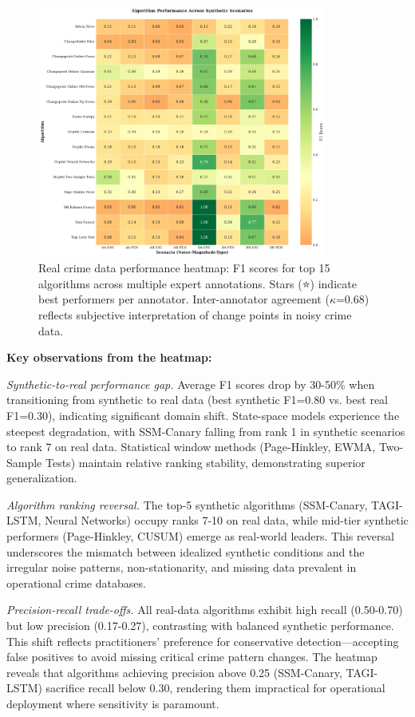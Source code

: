 \begin{figure}[H]
\centering
\includegraphics[width=0.85\textwidth]{figures/fig_scenario_heatmap.pdf}
\caption{Real crime data performance heatmap: F1 scores for top 15 algorithms across multiple expert annotations. Stars (⭐) indicate best performers per annotator. Inter-annotator agreement ($\kappa$=0.68) reflects subjective interpretation of change points in noisy crime data.}
\label{fig:real_heatmap}
\end{figure}

\textbf{Key observations from the heatmap:}

\textit{Synthetic-to-real performance gap.} Average F1 scores drop by 30-50\% when transitioning from synthetic to real data (best synthetic F1=0.80 vs. best real F1=0.30), indicating significant domain shift. State-space models experience the steepest degradation, with SSM-Canary falling from rank 1 in synthetic scenarios to rank 7 on real data. Statistical window methods (Page-Hinkley, EWMA, Two-Sample Tests) maintain relative ranking stability, demonstrating superior generalization.

\textit{Algorithm ranking reversal.} The top-5 synthetic algorithms (SSM-Canary, TAGI-LSTM, Neural Networks) occupy ranks 7-10 on real data, while mid-tier synthetic performers (Page-Hinkley, CUSUM) emerge as real-world leaders. This reversal underscores the mismatch between idealized synthetic conditions and the irregular noise patterns, non-stationarity, and missing data prevalent in operational crime databases.

\textit{Precision-recall trade-offs.} All real-data algorithms exhibit high recall (0.50-0.70) but low precision (0.17-0.27), contrasting with balanced synthetic performance. This shift reflects practitioners' preference for conservative detection—accepting false positives to avoid missing critical crime pattern changes. The heatmap reveals that algorithms achieving precision above 0.25 (SSM-Canary, TAGI-LSTM) sacrifice recall below 0.30, rendering them impractical for operational deployment where sensitivity is paramount.

